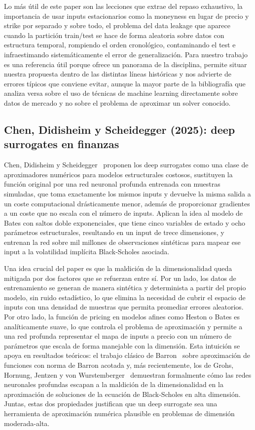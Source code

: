 \documentclass[11pt,a4paper]{article}
\begin{document}
Lo más útil de este paper son las lecciones que extrae del repaso exhaustivo, la importancia de usar inputs estacionarios como la moneyness en lugar de precio y strike por separado y sobre todo, el problema del data leakage que aparece cuando la partición train/test se hace de forma aleatoria sobre datos con estructura temporal, rompiendo el orden cronológico, contaminando el test e infraestimando sistemáticamente el error de generalización. Para nuestro trabajo es una referencia útil porque ofrece un panorama de la disciplina, permite situar nuestra propuesta dentro de las distintas líneas históricas y nos advierte de errores típicos que conviene evitar, aunque la mayor parte de la bibliografía que analiza versa sobre el uso de técnicas de machine learning directamente sobre datos de mercado y no sobre el problema de aproximar un solver conocido.

\subsection{Chen, Didisheim y Scheidegger (2025): deep surrogates en finanzas}\label{sec:chen}

Chen, Didisheim y Scheidegger~\cite{chen2025} proponen los deep surrogates como una clase de aproximadores numéricos para modelos estructurales costosos, sustituyen la función original por una red neuronal profunda entrenada con muestras simuladas, que toma exactamente los mismos inputs y devuelve la misma salida a un coste computacional drásticamente menor, además de proporcionar gradientes a un coste que no escala con el número de inputs. Aplican la idea al modelo de Bates con saltos doble exponenciales, que tiene cinco variables de estado y ocho parámetros estructurales, resultando en un input de trece dimensiones, y entrenan la red sobre mil millones de observaciones sintéticas para mapear ese input a la volatilidad implícita Black-Scholes asociada.

Una idea crucial del paper es que la maldición de la dimensionalidad queda mitigada por dos factores que se refuerzan entre sí. Por un lado, los datos de entrenamiento se generan de manera sintética y determinista a partir del propio modelo, sin ruido estadístico, lo que elimina la necesidad de cubrir el espacio de inputs con una densidad de muestras que permita promediar errores aleatorios. Por otro lado, la función de pricing en modelos afines como Heston o Bates es analíticamente suave, lo que controla el problema de aproximación y permite a una red profunda representar el mapa de inputs a precio con un número de parámetros que escala de forma manejable con la dimensión. Esta intuición se apoya en resultados teóricos: el trabajo clásico de Barron~\cite{barron1993} sobre aproximación de funciones con norma de Barron acotada y, más recientemente, los de Grohs, Hornung, Jentzen y von Wurstemberger~\cite{grohs2018} demuestran formalmente cómo las redes neuronales profundas escapan a la maldición de la dimensionalidad en la aproximación de soluciones de la ecuación de Black-Scholes en alta dimensión. Juntas, estas dos propiedades justifican que un deep surrogate sea una herramienta de aproximación numérica plausible en problemas de dimensión moderada-alta.
\end{document}

